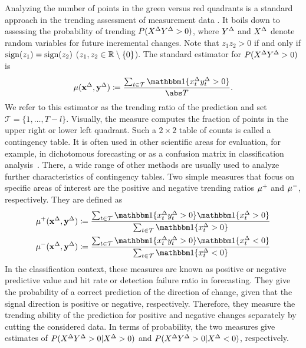 Analyzing the number of points in the green versus red quadrants is a standard approach in the trending assessment of measurement data \parencite{Critchley2010,Saugel2015}. 
It boils down to assessing the probability of trending $P(X^{\Delta} Y^{\Delta} > 0)$, where $Y^{\Delta}$ and $X^{\Delta}$ denote random variables for future incremental changes.
Note that $z_1 z_2 > 0$ if and only if $\operatorname{sign}(z_1) = \operatorname{sign}(z_2)$ ($z_1, z_2 \in \mathbb{R} \setminus \{ 0 \}$).
The standard estimator for $P(X^{\Delta} Y^{\Delta} > 0)$ is
\begin{equation}
    \acc (\diffx, \diffy) \coloneqq \frac{\sum_{t \in \mathcal{T}} \ind{\diffxt \diffyt > 0}}{\card{T}}.\label{eq:acc}
\end{equation}
We refer to this estimator as the trending ratio of the prediction and set $\mathcal{T} = \{1, \dots, T-l\}$. 
Visually, the measure computes the fraction of points in the upper right or lower left quadrant.
Such a $2 \times 2$ table of counts is called a contingency table.
It is often used in other scientific areas for evaluation, for example, in dichotomous forecasting or as a confusion matrix in classification analysis~\parencites(see, e.g., the introductions in)()[Ch. 4]{James2021}[Ch. 3]{Jolliffe2012}.
There, a wide range of other methods are usually used to analyze further characteristics of contingency tables.
Two simple measures that focus on specific areas of interest  are the positive and negative trending ratios $\mu^+$ and $\mu^-$, respectively.
They are defined as
\begin{align}
    \accp (\diffx, \diffy) &\coloneqq \frac{\sum_{t \in \mathcal{T}} \ind{\diffxt \diffyt > 0} \ind{\diffxt > 0}}{\sum_{t \in \mathcal{T}} \ind{\diffxt > 0}} \label{eq:accp}\\
    \accm (\diffx, \diffy) &\coloneqq \frac{\sum_{t \in \mathcal{T}} \ind{\diffxt \diffyt > 0} \ind{\diffxt < 0}}{\sum_{t \in \mathcal{T}} \ind{\diffxt < 0}}\label{eq:accm}
\end{align}
In the classification context, these measures are known as positive or negative predictive value and hit rate or detection failure ratio in forecasting.
They give the probability of a correct prediction of the direction of change, given that the signal direction is positive or negative, respectively.
Therefore, they measure the trending ability of the prediction for positive and negative changes separately by cutting the considered data.
In terms of probability, the two measures give estimates of $P(X^{\Delta} Y^{\Delta} > 0 | X^{\Delta} > 0)$ and $P(X^{\Delta} Y^{\Delta} > 0 | X^{\Delta} < 0)$, respectively.

